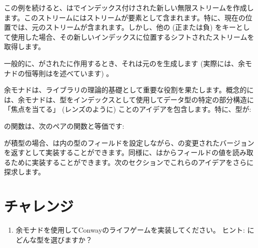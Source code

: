 この例を続けると、はでインデックス付けされた新しい無限ストリームを作成します。このストリームにはストリームが要素として含まれます。特に、現在の位置では、元のストリームが含まれます。しかし、他の (正または負) をキーとして使用した場合、その新しいインデックスに位置するシフトされたストリームを取得します。

一般的に、がされたに作用するとき、それは元のを生成します (実際には、余モナドの恒等則はを述べています) 。

余モナドは、ライブラリの理論的基礎として重要な役割を果たします。概念的には、余モナドは、型をインデックスとして使用してデータ型の特定の部分構造に「焦点を当てる」 (レンズのように) ことのアイデアを包含します。特に、型が: 

の関数は、次のペアの関数と等価です: 

が積型の場合、は内の型のフィールドを設定しながら、の変更されたバージョンを返すとして実装することができます。同様に、はからフィールドの値を読み取るために実装することができます。次のセクションでこれらのアイデアをさらに探求します。

\section{チャレンジ}

\begin{enumerate}
  \tightlist
  \item
        余モナドを使用してConwayのライフゲームを実装してください。
        ヒント: にどんな型を選びますか？
\end{enumerate}


